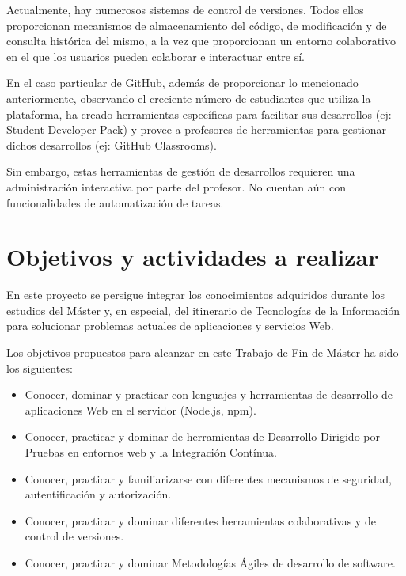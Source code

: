 Actualmente, hay numerosos sistemas de control de versiones. Todos ellos proporcionan mecanismos de almacenamiento del código, de modificación y de consulta histórica del mismo, a la vez que proporcionan un entorno colaborativo en el que los usuarios pueden colaborar e interactuar entre sí.

En el caso particular de GitHub, además de proporcionar lo mencionado anteriormente, observando el creciente número de estudiantes que utiliza la plataforma, ha creado herramientas específicas para facilitar sus desarrollos (ej: Student Developer Pack) y provee a profesores de herramientas para gestionar dichos desarrollos (ej: GitHub Classrooms).

Sin embargo, estas herramientas de gestión de desarrollos requieren una administración interactiva por parte del profesor. No cuentan aún con funcionalidades de automatización de tareas.

\section{Objetivos y actividades a realizar}
\label{1:sec:3}

En este proyecto se persigue integrar los conocimientos adquiridos durante los estudios del Máster y,
en especial, del itinerario de Tecnologías de la Información para solucionar problemas actuales de aplicaciones y servicios Web.

Los objetivos propuestos para alcanzar en este Trabajo de Fin de Máster ha sido los siguientes:
\begin{itemize}
  \item Conocer, dominar y practicar con lenguajes y herramientas de desarrollo de aplicaciones Web
    en el servidor (Node.js, npm).
  \item Conocer, practicar y dominar de herramientas de Desarrollo Dirigido por Pruebas en entornos
web y la Integración Contínua.
  \item Conocer, practicar y familiarizarse con diferentes mecanismos de seguridad, autentificación
y autorización.
  \item Conocer, practicar y dominar diferentes herramientas colaborativas y de control de versiones.
  \item Conocer, practicar y dominar Metodologías Ágiles de desarrollo de software.
\end{itemize}
\bigskip

